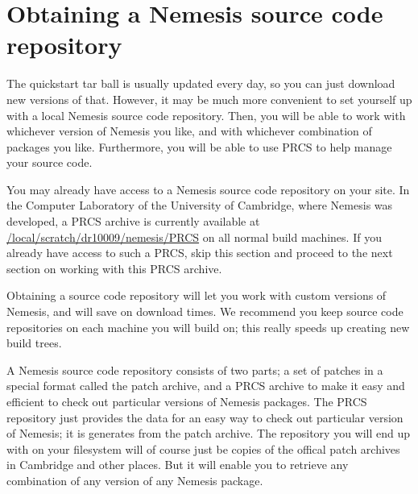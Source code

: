 \documentclass[a4paper]{article}
\newcommand{\dir}[1]{\url{#1}}
\begin{document}
\section{Obtaining a Nemesis source code repository}

The quickstart tar ball is usually updated every day, so you can just
download new versions of that. However, it may be much more convenient
to set yourself up with a local Nemesis source code repository. Then,
you will be able to work with whichever version of Nemesis you like,
and with whichever combination of packages you like. Furthermore, you
will be able to use PRCS to help manage your source code.

You may already have access to a Nemesis source code repository on
your site. In the Computer Laboratory of the University of Cambridge,
where Nemesis was developed, a PRCS archive is currently available at
\dir{/local/scratch/dr10009/nemesis/PRCS} on all normal build
machines. If you already have access to such a PRCS, skip this section
and proceed to the next section on working with this PRCS archive.

Obtaining a source code repository will let you work with custom
versions of Nemesis, and will save on download times.  We recommend
you keep source code repositories on each machine you will build on;
this really speeds up creating new build trees.

A Nemesis source code repository consists of two parts; a set of
patches in a special format called the patch archive, and a PRCS
archive to make it easy and efficient to check out particular versions
of Nemesis packages. The PRCS repository just provides the data for an
easy way to check out particular version of Nemesis; it is generates
from the patch archive.  The repository you will end up with on your
filesystem will of course just be copies of the offical patch archives
in Cambridge and other places. But it will enable you to retrieve any
combination of any version of any Nemesis package.
\end{document}
